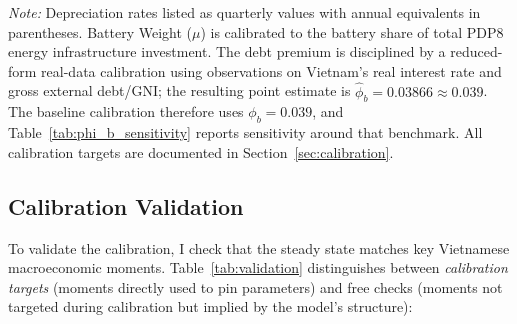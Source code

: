 \documentclass[12pt, a4paper]{article}
\begin{document}
\begin{table}[H]
		\vspace{0.2cm}
		\parbox{\textwidth}{\footnotesize \textit{Note:} Depreciation rates listed as quarterly values with annual equivalents in parentheses. Battery Weight ($\mu$) is calibrated to the battery share of total PDP8 energy infrastructure investment. The debt premium is disciplined by a reduced-form real-data calibration using \citep{worldbank2024} observations on Vietnam's real interest rate and gross external debt/GNI; the resulting point estimate is $\hat{\phi}_b = 0.03866 \approx 0.039$. The baseline calibration therefore uses $\phi_b = 0.039$, and Table~\ref{tab:phi_b_sensitivity} reports sensitivity around that benchmark. All calibration targets are documented in Section~\ref{sec:calibration}.}
	\end{table}
	
	\subsection{Calibration Validation} \label{sec:calibration_validation}

	To validate the calibration, I check that the steady state matches key Vietnamese macroeconomic moments. Table~\ref{tab:validation} distinguishes between \textit{calibration targets} (moments directly used to pin parameters) and free checks (moments not targeted during calibration but implied by the model's structure):
\end{document}
